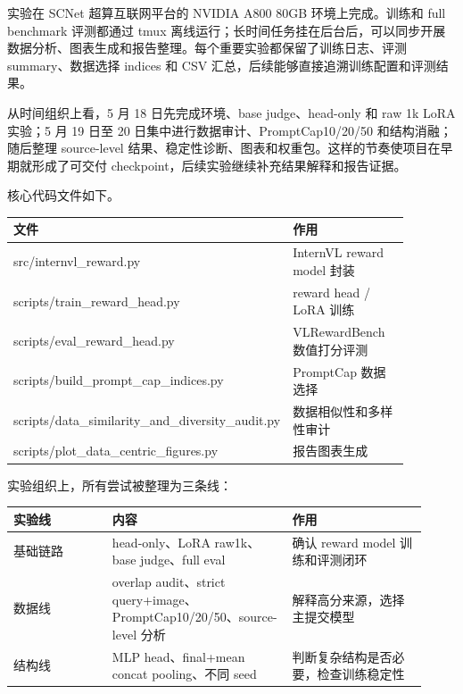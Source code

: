 \documentclass[11pt,a4paper]{ctexart}
\renewcommand{\arraystretch}{1.16}
\begin{document}
实验在 SCNet 超算互联网平台的 NVIDIA A800 80GB 环境上完成。训练和 full benchmark 评测都通过 tmux 离线运行；长时间任务挂在后台后，可以同步开展数据分析、图表生成和报告整理。每个重要实验都保留了训练日志、评测 summary、数据选择 indices 和 CSV 汇总，后续能够直接追溯训练配置和评测结果。

从时间组织上看，5 月 18 日先完成环境、base judge、head-only 和 raw 1k LoRA 实验；5 月 19 日至 20 日集中进行数据审计、PromptCap10/20/50 和结构消融；随后整理 source-level 结果、稳定性诊断、图表和权重包。这样的节奏使项目在早期就形成了可交付 checkpoint，后续实验继续补充结果解释和报告证据。

核心代码文件如下。

\begingroup
\small
\setlength{\tabcolsep}{7pt}
\renewcommand{\arraystretch}{1.22}
\begin{center}
\begin{longtable}{>{\raggedright\arraybackslash\ttfamily\footnotesize}p{0.50\linewidth} >{\raggedright\arraybackslash}p{0.38\linewidth}}
\toprule
\normalfont 文件 & 作用 \\
\midrule
src/\allowbreak internvl\_\allowbreak reward.py & InternVL reward model 封装 \\
scripts/\allowbreak train\_\allowbreak reward\_\allowbreak head.py & reward head / LoRA 训练 \\
scripts/\allowbreak eval\_\allowbreak reward\_\allowbreak head.py & VLRewardBench 数值打分评测 \\
scripts/\allowbreak build\_\allowbreak prompt\_\allowbreak cap\_\allowbreak indices.py & PromptCap 数据选择 \\
scripts/\allowbreak data\_\allowbreak similarity\_\allowbreak and\_\allowbreak diversity\_\allowbreak audit.py & 数据相似性和多样性审计 \\
scripts/\allowbreak plot\_\allowbreak data\_\allowbreak centric\_\allowbreak figures.py & 报告图表生成 \\
\bottomrule
\end{longtable}
\end{center}
\endgroup

实验组织上，所有尝试被整理为三条线：

\begin{center}\small
\begin{longtable}{p{0.22\linewidth} p{0.40\linewidth} p{0.30\linewidth}}
\toprule
实验线 & 内容 & 作用 \\
\midrule
基础链路 & head-only、LoRA raw1k、base judge、full eval & 确认 reward model 训练和评测闭环 \\
数据线 & overlap audit、strict query+image、PromptCap10/20/50、source-level 分析 & 解释高分来源，选择主提交模型 \\
结构线 & MLP head、final+mean concat pooling、不同 seed & 判断复杂结构是否必要，检查训练稳定性 \\
\bottomrule
\end{longtable}\end{center}
\end{document}
